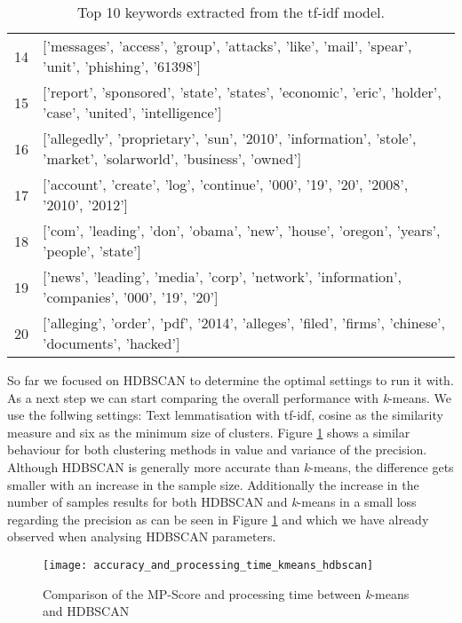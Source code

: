 \begin{table}[h]
{\begin{tabular}{rl}
            14 & ['messages', 'access', 'group', 'attacks', 'like', 'mail', 'spear', 'unit', 'phishing', '61398']                        \\
            15 & ['report', 'sponsored', 'state', 'states', 'economic', 'eric', 'holder', 'case', 'united', 'intelligence']              \\
            16 & ['allegedly', 'proprietary', 'sun', '2010', 'information', 'stole', 'market', 'solarworld', 'business', 'owned']        \\
            17 & ['account', 'create', 'log', 'continue', '000', '19', '20', '2008', '2010', '2012']                                     \\
            18 & ['com', 'leading', 'don', 'obama', 'new', 'house', 'oregon', 'years', 'people', 'state']                                \\
            19 & ['news', 'leading', 'media', 'corp', 'network', 'information', 'companies', '000', '19', '20']                          \\
            20 & ['alleging', 'order', 'pdf', '2014', 'alleges', 'filed', 'firms', 'chinese', 'documents', 'hacked']                     \\
        \hline
        \end{tabular}
        }
        \caption{Top 10 keywords extracted from the tf-idf model.}
        \label{tab:clustering_example_features}
\end{table}

So far we focused on HDBSCAN to determine the optimal settings to run it with.
As a next step we can start comparing the overall performance with \textit{k}-means.
We use the follwing settings: Text lemmatisation with tf-idf,
cosine as the similarity measure and six as the minimum size of clusters.
Figure \ref{fig:precision_and_processing_time_kmeans_hdbscan} shows a similar behaviour
for both clustering methods in value and variance of the precision.
Although HDBSCAN is generally more accurate than \textit{k}-means,
the difference gets smaller with an increase in the sample size.
Additionally the increase in the number of samples results for both HDBSCAN
and \textit{k}-means in a small loss regarding the precision as can be seen in Figure \ref{fig:precision_and_processing_time_kmeans_hdbscan}
and which we have already observed when analysing HDBSCAN parameters.

\begin{figure}[h]
    \centering
    \texttt{[image: accuracy\_and\_processing\_time\_kmeans\_hdbscan]}
    \caption{Comparison of the MP-Score and processing time between \textit{k}-means and HDBSCAN}
    \label{fig:precision_and_processing_time_kmeans_hdbscan}
\end{figure}

